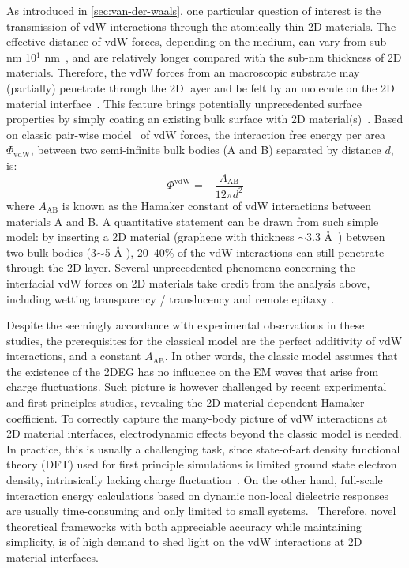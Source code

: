 As introduced in \autoref{sec:van-der-waals}, one particular question
of interest is the transmission of vdW interactions through the
atomically-thin 2D materials.
%
The effective distance of vdW forces, depending on the medium, can
vary from sub-nm 10$^{1}$ nm~\cite{Israelachvili_2011_book}, and are
relatively longer compared with the sub-nm thickness of 2D materials.
%
Therefore, the vdW forces from an macroscopic substrate may
(partially) penetrate through the 2D layer and be felt by an molecule
on the 2D material interface~\cite{shih_2013_wetting_natmat}.
%
This feature
brings potentially unprecedented surface properties by simply coating
an existing bulk surface with 2D
material(s)~\cite{Prasai_2012_coating,rafiee_2012_transparency,Tsoi_2014_vdW_screening_2D}.
%
Based on classic pair-wise model~\cite{Hamaker_1937_vdW} of vdW
forces, the interaction free energy per area $\Phi_{\mathrm{vdW}}$,
between two semi-infinite bulk bodies (A and B) separated by distance
$d$, is:
\begin{equation}
  \label{eq:vdw-hamaker-res}
  \Phi^{\mathrm{vdW}} = - \frac{A_{\mathrm{AB}}}{12 \pi d^{2}}
\end{equation}
where $A_{\mathrm{AB}}$ is known as the Hamaker constant of vdW
interactions between materials A and B.
%
A quantitative statement can be drawn from such simple model: by inserting a 2D material (\eg graphene
with thickness $\sim{}$3.3 \AA{}~\cite{Shearer_2016}) between two bulk
bodies (3$\sim{}$5 \AA{} ), 20--40\% of the vdW
interactions can still penetrate through the 2D layer.
%
Several unprecedented phenomena concerning the interfacial vdW forces
on 2D materials take credit from the analysis above, including wetting
transparency / translucency
\cite{Shih_2012_prl,rafiee_2012_transparency,Gurarslan_2016_screen_MoS2} and remote
epitaxy \cite{Kim_2017_remote_epi_Gr,Kong_2018_pol}.

Despite the seemingly accordance with experimental observations in
these studies, the prerequisites for the classical model are the
perfect additivity of vdW interactions, and a constant
$A_{\mathrm{AB}}$. 
%
In other words, the classic model assumes that the existence of the
2DEG has no influence on the EM waves that arise from charge
fluctuations.
%
Such picture is however challenged by recent experimental
\cite{Tsoi_2014_vdW_screening_2D} and first-principles
\cite{Ambrosetti_2018_carbon,Liu_2018_gr,Li_2018_screen} studies,
revealing the 2D material-dependent Hamaker coefficient.
%
To correctly capture the many-body picture of vdW interactions at 2D
material interfaces, electro\-dynamic effects beyond the classic model
is needed.
%
In practice, this is usually a challenging task, since state-of-art
density functional theory (DFT) used for first principle simulations
is limited ground state electron density, intrinsically lacking charge
fluctuation~\cite{Woods_2016_rev_vdw}.
%
On the other hand, full-scale interaction energy calculations based on
dynamic non-local dielectric responses are usually time-consuming and
only limited to small
systems.~\cite{Hermann_2017_vdW_rev,Zhou_2017_lifshitz}
%
Therefore, novel theoretical frameworks with both appreciable accuracy
while maintaining simplicity, is of high demand to shed light on the
vdW interactions at 2D material interfaces.

